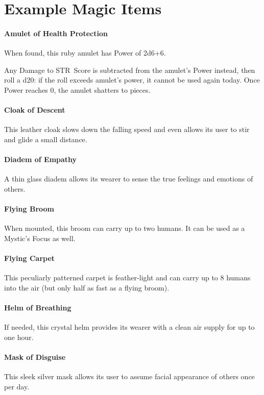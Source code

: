 \documentclass[itdr/core]{subfiles}
\begin{document}
\vfill
{}
\vfill
\break


\section{Example Magic Items}

\paragraph{Amulet of Health Protection}
When found, this ruby amulet has Power of 2d6+6.

Any Damage to STR~Score is subtracted from the amulet's Power instead, then roll a d20: if the roll exceeds amulet's power, it cannot be used again today. Once Power reaches 0, the amulet shatters to pieces.

\vfill
\paragraph{Cloak of Descent}
This leather cloak slows down the falling speed and even allows its user to stir and glide a small distance.

\vfill
\paragraph{Diadem of Empathy}
A thin glass diadem allows its wearer to sense the true feelings and emotions of others.

\vfill
\paragraph{Flying Broom}
When mounted, this broom can carry up to two \mbox{humans}. It can be used as a Mystic's Focus as well.

\vfill
\paragraph{Flying Carpet}
This peculiarly patterned carpet is feather-light and can carry up to 8 humans into the air (but only half as fast as a flying broom).

\vfill
\paragraph{Helm of Breathing}
If needed, this crystal helm provides its wearer with a clean air supply for up to one hour.

\vfill
\paragraph{Mask of Disguise}
This sleek silver mask allows its user to assume \mbox{facial} appearance of others once per day.
\end{document}
